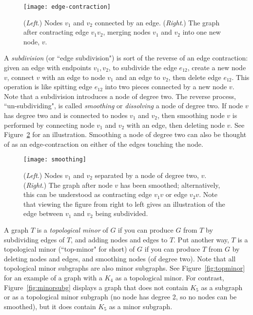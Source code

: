 \begin{figure}[h!]
  \centering
  \texttt{[image: edge-contraction]}
  \caption{(\emph{Left}.) Nodes $v_1$ and $v_2$ connected by an edge. (\emph{Right}.) The graph after contracting edge $v_1v_2$, merging nodes $v_1$ and $v_2$ into one new node, $v$.\label{fig:contracting}}
\end{figure}

A \emph{subdivision} (or ``edge subdivision") is sort of the reverse of an edge contraction: given an edge with endpoints $v_1, v_2$, to subdivide the edge $e_{12}$, create a new node $v$, connect $v$ with an edge to node $v_1$ and an edge to $v_2$, then delete edge $e_{12}$. This operation is like spitting edge $e_{12}$ into two pieces connected by a new node $v$. Note that a subdivision introduces a node of degree two. The reverse process, ``un-subdividing", is called \emph{smoothing} or \emph{dissolving} a node of degree two. If node $v$ has degree two and is connected to nodes $v_1$ and $v_2$, then smoothing node $v$ is performed by connecting node $v_1$ and $v_2$ with an edge, then deleting node $v$. See Figure~\ref{fig:smoothing} for an illustration. Smoothing a node of degree two can also be thought of as an edge-contraction on either of the edges touching the node.

\begin{figure}[h!]
  \centering
  \texttt{[image: smoothing]}
  \caption{(\emph{Left}.) Nodes $v_1$ and $v_2$ separated by a node of degree two, $v$. (\emph{Right}.) The graph after node $v$ has been smoothed; alternatively, this can be understood as contracting edge $v_1v$ or edge $v_2v$.
  Note that viewing the figure from right to left gives an illustration of the edge between $v_1$ and $v_2$ being subdivided.\label{fig:smoothing}}
\end{figure}

A graph $T$ is a \emph{topological minor} of $G$ if you can produce $G$ from $T$ by subdividing edges of $T$, and adding nodes and edges to $T$. Put another way, $T$ is a topological minor (``top-minor" for short) of $G$ if you can produce $T$ from $G$ by deleting nodes and edges, and smoothing nodes (of degree two). Note that all topological minor subgraphs are also minor subgraphs. See Figure~\ref{fig:topminor} for an example of a graph with a $K_4$ as a topological minor.
For contrast, Figure~\ref{fig:minorsubg} displays a graph that does not contain $K_5$ as a subgraph or as a topological minor subgraph (no node has degree 2, so no nodes can be smoothed), but it does contain $K_5$ as a minor subgraph.

